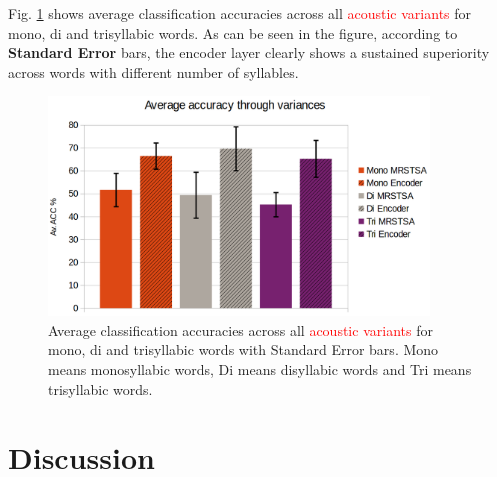 \documentclass[10pt,letterpaper]{article}
\begin{document}
Fig. \ref{fig:AV_ACC} shows average classification accuracies across all \textcolor{red}{acoustic variants} for mono, di and trisyllabic words.
As can be seen in the figure, according to \textbf{Standard Error} bars, the encoder layer clearly shows
a sustained superiority across words with different number of syllables.
 

\begin{figure}[h!]
    \centering
    \includegraphics[width=0.9\textwidth]{AV_ACC.png}
    \caption{Average classification accuracies across all \textcolor{red}{acoustic variants} for mono, di and trisyllabic words with Standard Error bars.
    Mono means monosyllabic words, Di means disyllabic words and Tri means trisyllabic words.}
    \label{fig:AV_ACC}
\end{figure}













\section*{Discussion}
\end{document}
